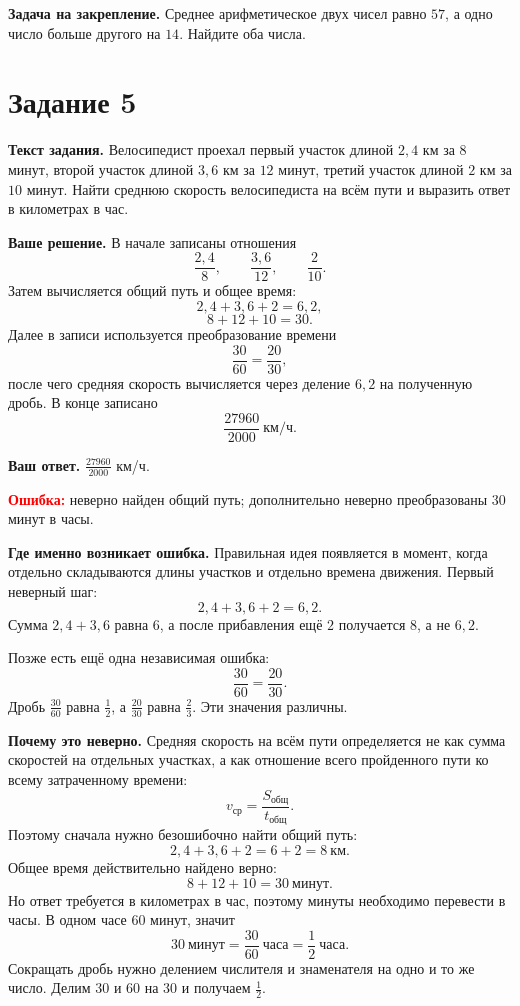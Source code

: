 \documentclass[12pt,a4paper]{article}
\begin{document}
\textbf{Задача на закрепление.} Среднее арифметическое двух чисел равно $57$, а одно число больше другого на $14$. Найдите оба числа.

\newpage
{}\label{task:5}
\section*{Задание 5}

\textbf{Текст задания.} Велосипедист проехал первый участок длиной $2{,}4$ км за $8$ минут, второй участок длиной $3{,}6$ км за $12$ минут, третий участок длиной $2$ км за $10$ минут. Найти среднюю скорость велосипедиста на всём пути и выразить ответ в километрах в час.

\textbf{Ваше решение.}
В начале записаны отношения
\[
\frac{2{,}4}{8},\qquad \frac{3{,}6}{12},\qquad \frac{2}{10}.
\]
Затем вычисляется общий путь и общее время:
\[
2{,}4+3{,}6+2=6{,}2,
\]
\[
8+12+10=30.
\]
Далее в записи используется преобразование времени
\[
\frac{30}{60}=\frac{20}{30},
\]
после чего средняя скорость вычисляется через деление $6{,}2$ на полученную дробь. В конце записано
\[
\frac{27960}{2000}\ \text{км/ч}.
\]

\textbf{Ваш ответ.} $\frac{27960}{2000}$ км/ч.

\textcolor{red}{\textbf{Ошибка:}} неверно найден общий путь; дополнительно неверно преобразованы $30$ минут в часы.

\textbf{Где именно возникает ошибка.}
Правильная идея появляется в момент, когда отдельно складываются длины участков и отдельно времена движения. Первый неверный шаг:
\[
2{,}4+3{,}6+2=6{,}2.
\]
Сумма $2{,}4+3{,}6$ равна $6$, а после прибавления ещё $2$ получается $8$, а не $6{,}2$.

Позже есть ещё одна независимая ошибка:
\[
\frac{30}{60}=\frac{20}{30}.
\]
Дробь $\frac{30}{60}$ равна $\frac{1}{2}$, а $\frac{20}{30}$ равна $\frac{2}{3}$. Эти значения различны.

\textbf{Почему это неверно.}
Средняя скорость на всём пути определяется не как сумма скоростей на отдельных участках, а как отношение всего пройденного пути ко всему затраченному времени:
\[
v_{\text{ср}}=\frac{S_{\text{общ}}}{t_{\text{общ}}}.
\]
Поэтому сначала нужно безошибочно найти общий путь:
\[
2{,}4+3{,}6+2=6+2=8\ \text{км}.
\]
Общее время действительно найдено верно:
\[
8+12+10=30\ \text{минут}.
\]
Но ответ требуется в километрах в час, поэтому минуты необходимо перевести в часы. В одном часе $60$ минут, значит
\[
30\ \text{минут}=\frac{30}{60}\ \text{часа}=\frac{1}{2}\ \text{часа}.
\]
Сокращать дробь нужно делением числителя и знаменателя на одно и то же число. Делим $30$ и $60$ на $30$ и получаем $\frac12$.
\end{document}
